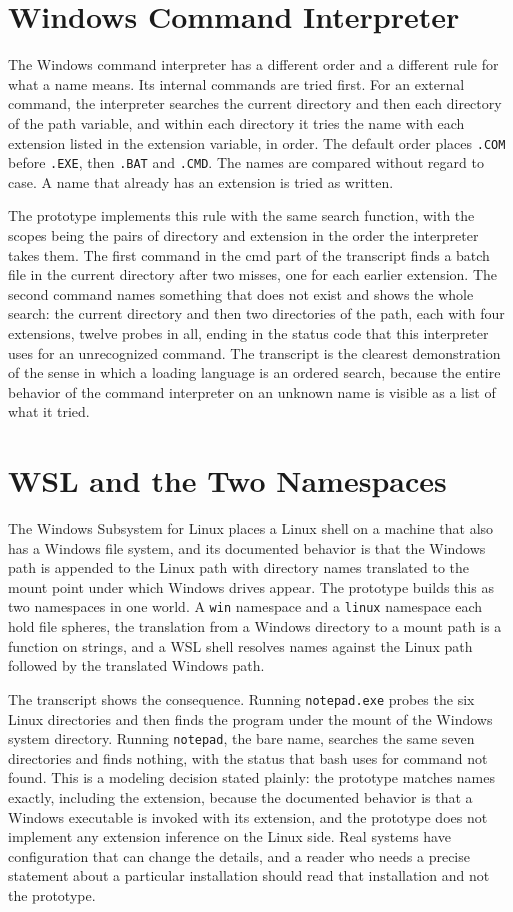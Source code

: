 \section{Windows Command Interpreter}

The Windows command interpreter has a different order and a different rule for what a name means. Its internal commands are tried first. For an external command, the interpreter searches the current directory and then each directory of the path variable, and within each directory it tries the name with each extension listed in the extension variable, in order. The default order places \texttt{.COM} before \texttt{.EXE}, then \texttt{.BAT} and \texttt{.CMD}. The names are compared without regard to case. A name that already has an extension is tried as written.

The prototype implements this rule with the same search function, with the scopes being the pairs of directory and extension in the order the interpreter takes them. The first command in the cmd part of the transcript finds a batch file in the current directory after two misses, one for each earlier extension. The second command names something that does not exist and shows the whole search: the current directory and then two directories of the path, each with four extensions, twelve probes in all, ending in the status code that this interpreter uses for an unrecognized command. The transcript is the clearest demonstration of the sense in which a loading language is an ordered search, because the entire behavior of the command interpreter on an unknown name is visible as a list of what it tried.

\section{WSL and the Two Namespaces}

The Windows Subsystem for Linux places a Linux shell on a machine that also has a Windows file system, and its documented behavior is that the Windows path is appended to the Linux path with directory names translated to the mount point under which Windows drives appear. The prototype builds this as two namespaces in one world. A \texttt{win} namespace and a \texttt{linux} namespace each hold file spheres, the translation from a Windows directory to a mount path is a function on strings, and a WSL shell resolves names against the Linux path followed by the translated Windows path.

The transcript shows the consequence. Running \texttt{notepad.exe} probes the six Linux directories and then finds the program under the mount of the Windows system directory. Running \texttt{notepad}, the bare name, searches the same seven directories and finds nothing, with the status that bash uses for command not found. This is a modeling decision stated plainly: the prototype matches names exactly, including the extension, because the documented behavior is that a Windows executable is invoked with its extension, and the prototype does not implement any extension inference on the Linux side. Real systems have configuration that can change the details, and a reader who needs a precise statement about a particular installation should read that installation and not the prototype.

